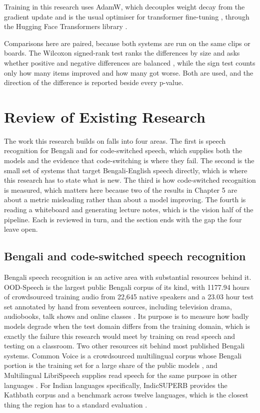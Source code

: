 Training in this research uses AdamW, which decouples weight decay from the gradient update
and is the usual optimiser for transformer fine-tuning \cite{loshchilov2019adamw}, through
the Hugging Face Transformers library \cite{wolf2020transformers}.

Comparisons here are paired, because both systems are run on the same clips or boards. The
Wilcoxon signed-rank test ranks the differences by size and asks whether positive and
negative differences are balanced \cite{wilcoxon1945}, while the sign test counts only how
many items improved and how many got worse. Both are used, and the direction of the
difference is reported beside every p-value.

\section{Review of Existing Research}

The work this research builds on falls into four areas. The first is speech recognition
for Bengali and for code-switched speech, which supplies both the models and the
evidence that code-switching is where they fail. The second is the small set of systems
that target Bengali-English speech directly, which is where this research has to state
what is new. The third is how code-switched recognition is measured, which matters here
because two of the results in Chapter 5 are about a metric misleading rather than about
a model improving. The fourth is reading a whiteboard and generating lecture notes,
which is the vision half of the pipeline. Each is reviewed in turn, and the section ends
with the gap the four leave open.

\subsection{Bengali and code-switched speech recognition}

Bengali speech recognition is an active area with substantial resources behind it.
OOD-Speech is the largest public Bengali corpus of its kind, with 1177.94 hours of
crowdsourced training audio from 22,645 native speakers and a 23.03 hour test set
annotated by hand from seventeen sources, including television drama, audiobooks, talk
shows and online classes \cite{rakib2023oodspeech}. Its purpose is to measure how badly
models degrade when the test domain differs from the training domain, which is exactly
the failure this research would meet by training on read speech and testing on a classroom.
Two other resources sit behind most published Bengali systems. Common Voice is a
crowdsourced multilingual corpus whose Bengali portion is the training set for a large
share of the public models \cite{ardila2020commonvoice}, and Multilingual LibriSpeech
supplies read speech for the same purpose in other languages \cite{pratap2020mls}. For
Indian languages specifically, IndicSUPERB provides the Kathbath corpus and a benchmark
across twelve languages, which is the closest thing the region has to a standard
evaluation \cite{javed2023indicsuperb}.

